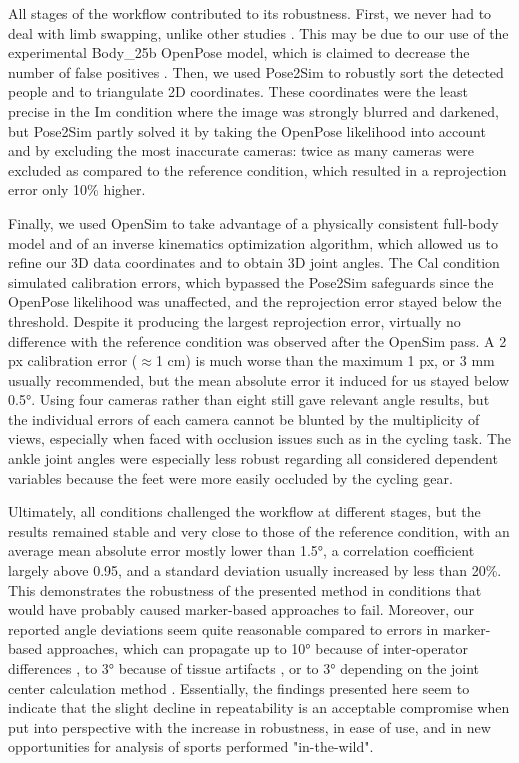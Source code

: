 All stages of the workflow contributed to its robustness. First, we never had to deal with limb swapping, unlike other studies \cite{Nakano2019,Slembrouck2020}. This may be due to our use of the experimental Body\_25b OpenPose model, which is claimed to decrease the number of false positives \cite{Hidalgo2019}. Then, we used Pose2Sim to robustly sort the detected people and to triangulate 2D coordinates. These coordinates were the least precise in the Im condition where the image was strongly blurred and darkened, but Pose2Sim partly solved it by taking the OpenPose likelihood into account and by excluding the most inaccurate cameras: twice as many cameras were excluded as compared to the reference condition, which resulted in a reprojection error only 10\% higher.

Finally, we used OpenSim to take advantage of a physically consistent full-body model and of an inverse kinematics optimization algorithm, which allowed us to refine our 3D data coordinates and to obtain 3D joint angles. The Cal condition simulated calibration errors, which bypassed the Pose2Sim safeguards since the OpenPose likelihood was unaffected, and the reprojection error stayed below the threshold. Despite it producing the largest reprojection error, virtually no difference with the reference condition was observed after the OpenSim pass. A 2 px calibration error ($\approx$1 cm) is much worse than the maximum 1 px, or 3 mm usually recommended, but the mean absolute error it induced for us stayed below 0.5°.
\clearpage
Using four cameras rather than eight still gave relevant angle results, but the individual errors of each camera cannot be blunted by the multiplicity of views, especially when faced with occlusion issues such as in the cycling task. The ankle joint angles were especially less robust regarding all considered dependent variables because the feet were more easily occluded by the cycling gear.

Ultimately, all conditions challenged the workflow at different stages, but the results remained stable and very close to those of the reference condition, with an average mean absolute error mostly lower than 1.5°, a correlation coefficient largely above 0.95, and a standard deviation usually increased by less than 20\%. This demonstrates the robustness of the presented method in conditions that would have probably caused marker-based approaches to fail. Moreover, our reported angle deviations seem quite reasonable compared to errors in marker-based approaches, which can propagate up to 10° because of inter-operator differences \cite{Croce1999,Gorton2009}, to 3° because of tissue artifacts \cite{Benoit2015,Cappozzo1995}, or to 3° depending on the joint center calculation method \cite{Leboeuf2019}. Essentially, the findings presented here seem to indicate that the slight decline in repeatability is an acceptable compromise when put into perspective with the increase in robustness, in ease of use, and in new opportunities for analysis of sports performed "in-the-wild".

